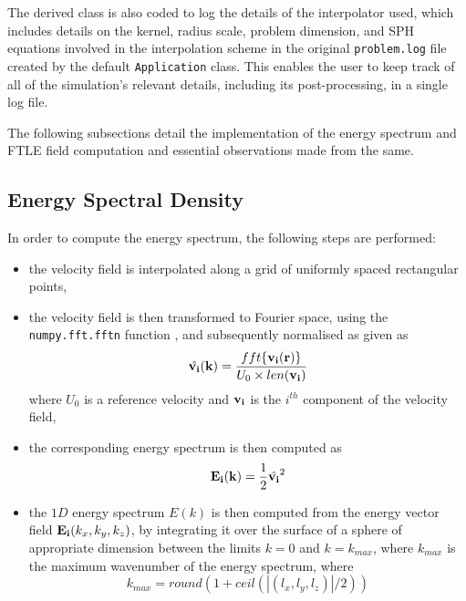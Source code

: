 The derived class is also coded to log the details of the interpolator used, which includes details on the kernel, radius scale, problem dimension, and SPH equations involved in the interpolation scheme in the original \texttt{problem.log} file created by the default \texttt{Application} class. This enables the user to keep track of all of the simulation's relevant details, including its post-processing, in a single log file.

The following subsections detail the implementation of the energy spectrum and FTLE field computation and essential observations made from the same.


\subsection{Energy Spectral Density}
In order to compute the energy spectrum, the following steps are performed:

\begin{itemize}
    \item the velocity field is interpolated along a grid of uniformly spaced rectangular points,
    \item the velocity field is then transformed to Fourier space, using the \texttt{numpy.fft.fftn} function \parencite{harris2020array}, and subsequently normalised as given as
    \begin{equation}
        \hat{\mathbf{v_i}}(\mathbf{k}) = \frac{ fft\{ \mathbf{v_i}(\mathbf{r}) \} }{U_0 \times len(\mathbf{v_i})}
    \end{equation}
    where $U_0$ is a reference velocity and $\mathbf{v_i}$ is the $i^{th}$ component of the velocity field,
    \item the corresponding energy spectrum is then computed as
    \begin{equation}
        \mathbf{E_i}(\mathbf{k}) = \frac{1}{2} \hat{\mathbf{v_i}}^2
    \end{equation}
    \item the $1D$ energy spectrum $E(k)$ is then computed from the energy vector field $\mathbf{E_i}(k_x, k_y, k_z)$, by integrating it over the surface of a sphere of appropriate dimension between the limits $k=0$ and $k=k_{max}$, where $k_{max}$ is the maximum wavenumber of the energy spectrum, where 
    \begin{equation}
        k_{max} = round(1 + ceil(|(l_x, l_y, l_z)|/2))
    \end{equation}
\end{itemize}

